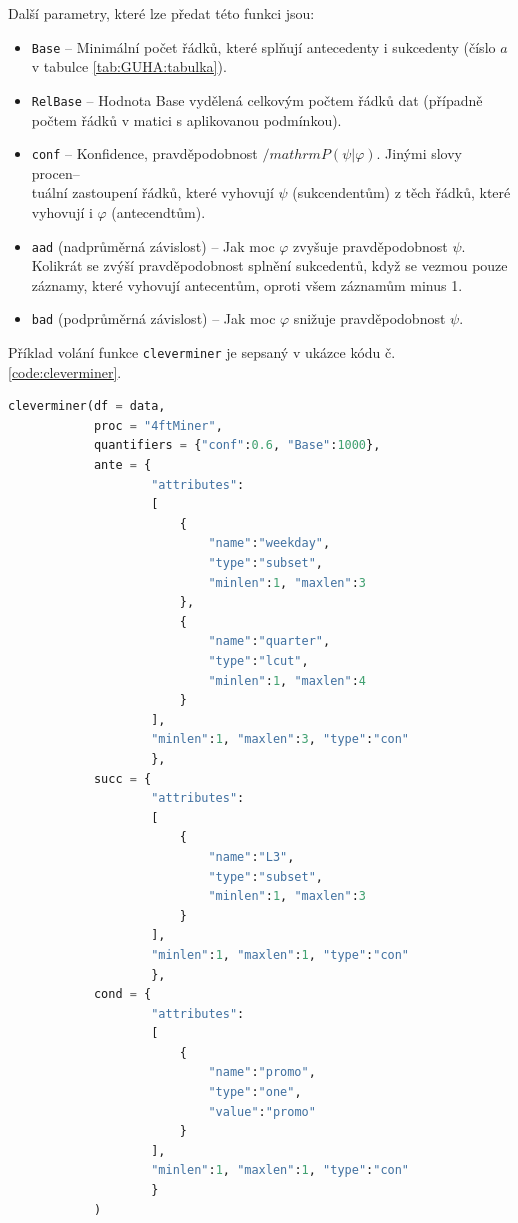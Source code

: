 Další parametry, které lze předat této funkci jsou:
\begin{itemize}
    \itemsep0em
    \item \texttt{Base} -- Minimální počet řádků, které splňují antecedenty i sukcedenty (číslo $a$ v tabulce \ref*{tab:GUHA:tabulka}).
    \item \texttt{RelBase} -- Hodnota Base vydělená celkovým počtem řádků dat (případně počtem řádků v matici s aplikovanou podmínkou).
    \item \texttt{conf} -- Konfidence, pravděpodobnost $/mathrm{P}(\psi|\varphi)$. Jinými slovy procen--\\tuální zastoupení řádků, které vyhovují $\psi$ (sukcendentům) z těch řádků, které vyhovují i $\varphi$ (antecendtům).
    \item \texttt{aad} (nadprůměrná závislost) -- Jak moc $\varphi$ zvyšuje  pravděpodobnost $\psi$. Kolikrát se zvýší pravděpodobnost splnění sukcedentů, když se vezmou pouze záznamy, které vyhovují antecentům, oproti všem záznamům minus 1.
    \item \texttt{bad} (podprůměrná závislost) -- Jak moc $\varphi$ snižuje  pravděpodobnost $\psi$.
\end{itemize}

Příklad volání funkce \texttt{cleverminer} je sepsaný v ukázce kódu č. \ref*{code:cleverminer}.
\begin{lstlisting}[language=Python, style=mystyle, label={code:cleverminer}, caption={Příklad volání funkce \texttt{cleverminer}.}]
cleverminer(df = data,
            proc = "4ftMiner", 
            quantifiers = {"conf":0.6, "Base":1000},
            ante = {
                    "attributes":
                    [
                        {
                            "name":"weekday", 
                            "type":"subset", 
                            "minlen":1, "maxlen":3
                        },
                        {
                            "name":"quarter", 
                            "type":"lcut", 
                            "minlen":1, "maxlen":4
                        }
                    ], 
                    "minlen":1, "maxlen":3, "type":"con"
                    },
            succ = {
                    "attributes":
                    [
                        {
                            "name":"L3", 
                            "type":"subset", 
                            "minlen":1, "maxlen":3
                        }
                    ], 
                    "minlen":1, "maxlen":1, "type":"con"
                    },
            cond = {
                    "attributes":
                    [
                        {
                            "name":"promo", 
                            "type":"one", 
                            "value":"promo"
                        }
                    ],
                    "minlen":1, "maxlen":1, "type":"con"
                    }
            )
\end{lstlisting}


